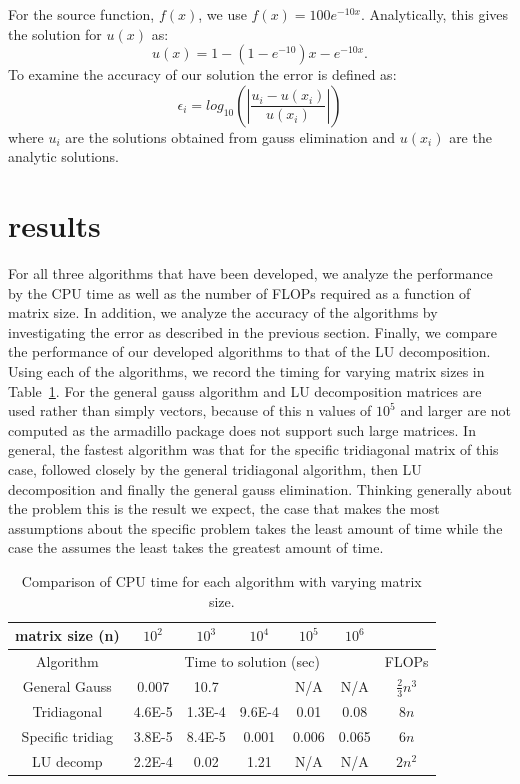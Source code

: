 \documentclass[prc,amsmath,twocolumn,superscriptaddress]{revtex4}
\begin{document}
For the source function, $f(x)$, we use $f(x)=100e^{-10x}$. Analytically, this gives the solution for $u(x)$ as:
\begin{equation}
u(x)=1-(1-e^{-10})x-e^{-10x}.
\end{equation}
To examine the accuracy of our solution the error is defined as:
\begin{equation}
\epsilon_i=log_{10}\left(\left|\frac{u_i-u(x_i)}{u(x_i)}\right|\right)
\label{error}
\end{equation}
where $u_i$ are the solutions obtained from gauss elimination and $u(x_i)$ are the analytic solutions.

\section{results}
\label{results}
For all three algorithms that have been developed, we analyze the performance by the CPU time as well as the number of FLOPs required as a function of matrix size. In addition, we analyze the accuracy of the algorithms by investigating the error as described in the previous section. Finally, we compare the performance of our developed algorithms to that of the LU decomposition. \\

Using each of the algorithms, we record the timing for varying matrix sizes in Table~\ref{time_table}. For the general gauss algorithm and LU decomposition matrices are used rather than simply vectors, because of this n values of $10^5$ and larger are not computed as the armadillo package does not support such large matrices. In general, the fastest algorithm was that for the specific tridiagonal matrix of this case, followed closely by the general tridiagonal algorithm, then LU decomposition and finally the general gauss elimination. Thinking generally about the problem this is the result we expect, the case that makes the most assumptions about the specific problem takes the least amount of time while the case the assumes the least takes the greatest amount of time.\\

\begin{table}[t]
\centering
\begin{tabular}{|c|c|c|c|c|c|c|}
\hline
matrix size (n)&$10^2$& $10^3$& $10^4$&  $10^5$& $10^6$&\\
\hline
Algorithm&\multicolumn{5}{|c|}{Time to solution (sec)}&FLOPs \\
\hline
General Gauss&0.007&10.7&&N/A&N/A&$\frac{2}{3}n^3$\\
Tridiagonal &4.6E-5&1.3E-4&9.6E-4&0.01&0.08&$8n$\\
Specific tridiag&3.8E-5&8.4E-5&0.001&0.006&0.065&$6n$\\
LU  decomp&2.2E-4&0.02&1.21&N/A&N/A&$2n^2$\\
\hline
\end{tabular}
\caption{Comparison of CPU time for each algorithm with varying matrix size.}
\label{time_table}
\end{table}
\end{document}
